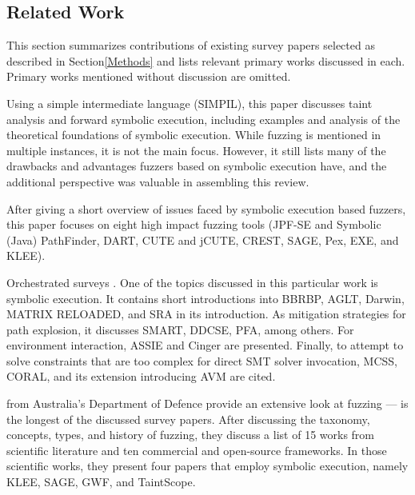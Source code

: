 \documentclass{article}
\begin{document}
\begin{multicols}{2}
    \section{Related Work}
    \label{SurveyPapers}

    This section summarizes contributions of existing survey papers selected as described in Section\ref{Methods} and lists relevant primary works discussed in each. Primary works mentioned without discussion are omitted.

    Using a simple intermediate language (SIMPIL), this paper discusses taint analysis and forward symbolic execution, including examples and analysis of the theoretical foundations of symbolic execution. While fuzzing is mentioned in multiple instances, it is not the main focus. However, it still lists many of the drawbacks and advantages fuzzers based on symbolic execution have, and the additional perspective was valuable in assembling this review.

    After giving a short overview of issues faced by symbolic execution based fuzzers, this paper focuses on eight high impact fuzzing tools (JPF-SE and Symbolic (Java) PathFinder\cite{JPFSE, JavaPathFinder}, DART\cite{DART}, CUTE\cite{CUTE} and jCUTE\cite{ExplicitPathModelChecking}, CREST\cite{CREST}, SAGE\cite{SAGE}, Pex\cite{Pex}, EXE\cite{EXE}, and KLEE\cite{KLEE}).

    Orchestrated surveys \cite{Orchestrated}. One of the topics discussed in this particular work is symbolic execution. It contains short introductions into BBRBP\cite{BBRBP}, AGLT\cite{AGLT}, Darwin\cite{Darwin}, MATRIX RELOADED\cite{MATRIXRELOADED}, and SRA\cite{SRA} in its introduction. As mitigation strategies for path explosion, it discusses SMART\cite{SMART}, DDCSE\cite{DDCSE}, PFA\cite{PFA}, among others. For environment interaction, ASSIE\cite{ASSIE} and Cinger\cite{Cinger} are presented. Finally, to attempt to solve constraints that are too complex for direct SMT solver invocation, MCSS\cite{MCSS}, CORAL\cite{CORAL}, and its extension introducing AVM\cite{CORALAVM} are cited.

    \citeauthor{FuzzingTheStateOfTheArt} from Australia's Department of Defence provide an extensive look at fuzzing —  is the longest of the discussed survey papers. After discussing the taxonomy, concepts, types, and history of fuzzing, they discuss a list of 15 works from scientific literature and ten commercial and open-source frameworks. In those scientific works, they present four papers that employ symbolic execution, namely KLEE\cite{KLEE}, SAGE\cite{SAGE}, GWF\cite{GWF}, and TaintScope\cite{TaintScope}.


\end{multicols}
\end{document}
